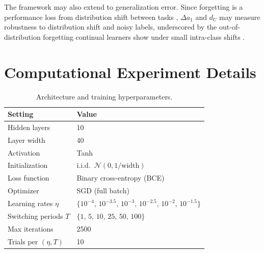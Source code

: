 \documentclass[pmlr]{jmlr} %
\begin{document}
The framework may also extend to generalization error. Since forgetting is a performance loss from distribution shift between tasks \citep{doan2021forgetting}, $\Delta a_1$ and $d_U$ may measure robustness to distribution shift and noisy labels, underscored by the out-of-distribution forgetting continual learners show under small intra-class shifts \citep{guo2023oodf}.




\appendix

\section{Computational Experiment Details}
\label{app:A}

\begin{table}[htbp]
\centering
\caption{Architecture and training hyperparameters.}
\label{tab:hparams}
\begin{tabular}{ll}
\toprule
\textbf{Setting} & \textbf{Value} \\
\midrule
Hidden layers & 10 \\
Layer width & 40 \\
Activation & Tanh \\
Initialization & i.i.d.\ $\mathcal{N}(0, 1/\text{width})$ \\
Loss function & Binary cross-entropy (BCE) \\
Optimizer & SGD (full batch) \\
Learning rates $\eta$ & $\{10^{-4},\,10^{-3.5},\,10^{-3},\,10^{-2.5},\,10^{-2},\,10^{-1.5}\}$ \\
Switching periods $T$ & $\{1,\,5,\,10,\,25,\,50,\,100\}$ \\
Max iterations & 2500 \\
Trials per $(\eta,T)$ & 10 \\
\bottomrule
\end{tabular}
\end{table}
\end{document}
